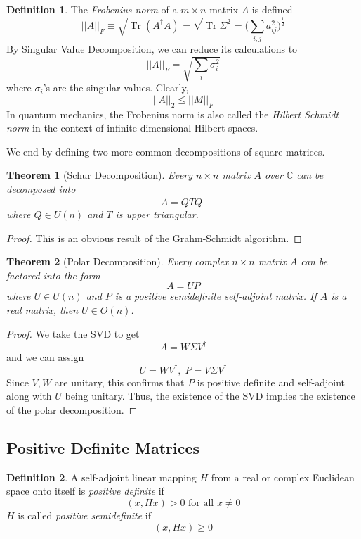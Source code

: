 \documentclass{article}
\DeclareMathOperator{\Tr}{Tr}
\newtheorem{theorem}{Theorem}[section]
\theoremstyle{remark}
\theoremstyle{definition}
\newtheorem{definition}{Definition}[section]
\begin{document}
\begin{definition}
The \textit{Frobenius norm} of a $m \times n$ matrix $A$ is defined
\[||A||_F \equiv \sqrt{\Tr{(A^\dagger A)}} = \sqrt{\Tr{\Sigma^2}} = \bigg( \sum_{i, j} a_{i j}^2 \bigg)^{\frac{1}{2}} \]
By Singular Value Decomposition, we can reduce its calculations to
\[ ||A||_F = \sqrt{\sum_i \sigma_i^2}\]
where $\sigma_i$'s are the singular values. Clearly, 
\[||A||_2 \leq ||M||_F\]
In quantum mechanics, the Frobenius norm is also called the \textit{Hilbert Schmidt norm} in the context of infinite dimensional Hilbert spaces. 
\end{definition}

We end by defining two more common decompositions of square matrices. 

\begin{theorem}[Schur Decomposition]
Every $n \times n$ matrix $A$ over $\mathbb{C}$ can be decomposed into
\[A = Q T Q^\dagger\]
where $Q \in U(n)$ and $T$ is upper triangular. 
\end{theorem}
\begin{proof}
This is an obvious result of the Grahm-Schmidt algorithm. 
\end{proof}

\begin{theorem}[Polar Decomposition]
Every complex $n \times n$ matrix $A$ can be factored into the form
\[A = U P\]
where $U \in U(n)$ and $P$ is a positive semidefinite self-adjoint matrix. If $A$ is a real matrix, then $U \in O(n)$. 
\end{theorem}
\begin{proof}
We take the SVD to get 
\[A = W \Sigma V^\dagger\]
and we can assign 
\[U = W V^\dagger, \; P = V \Sigma V^\dagger\]
Since $V, W$ are unitary, this confirms that $P$ is positive definite and self-adjoint along with $U$ being unitary. Thus, the existence of the SVD implies the existence of the polar decomposition. 
\end{proof}

\subsection{Positive Definite Matrices}
\begin{definition}
A self-adjoint linear mapping $H$ from a real or complex Euclidean space onto itself is \textit{positive definite} if 
\[(x, H x) > 0 \text{ for all } x \neq 0\]
$H$ is called \textit{positive semidefinite} if 
\[(x, H x) \geq 0\]
\end{definition}
\end{document}
